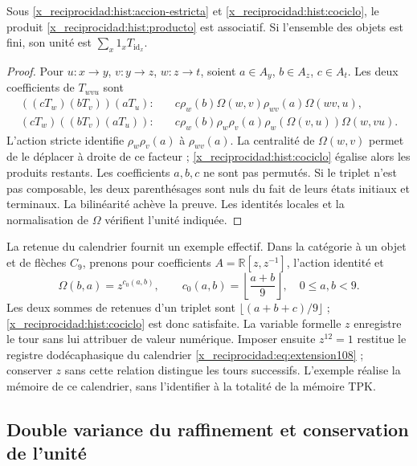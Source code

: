 \begin{proposition}
Sous \eqref{x_reciprocidad:hist:accion-estricta} et \eqref{x_reciprocidad:hist:cociclo}, le produit
\eqref{x_reciprocidad:hist:producto} est associatif. Si l’ensemble des objets est fini,
son unité est \(\sum_x1_xT_{\operatorname{id}_x}\).
\end{proposition}
\begin{proof}
Pour \(u:x\to y\), \(v:y\to z\), \(w:z\to t\), soient
\(a\in A_y\), \(b\in A_z\), \(c\in A_t\). Les deux coefficients
de \(T_{wvu}\) sont
\begin{align*}
 ((cT_w)(bT_v))(aT_u):\quad&
 c\rho_w(b)\Omega(w,v)\rho_{wv}(a)\Omega(wv,u),\\
 (cT_w)((bT_v)(aT_u)):\quad&
 c\rho_w(b)\rho_w\rho_v(a)\rho_w(\Omega(v,u))\Omega(w,vu).
\end{align*}
L’action stricte identifie \(\rho_w\rho_v(a)\) à \(\rho_{wv}(a)\).
La centralité de \(\Omega(w,v)\) permet de le déplacer à droite de
ce facteur ; \eqref{x_reciprocidad:hist:cociclo} égalise alors les produits restants.
Les coefficients \(a,b,c\) ne sont pas permutés. Si le triplet n’est pas composable,
les deux parenthésages sont nuls du fait de leurs états initiaux et terminaux.
La bilinéarité achève la preuve. Les identités locales et la
normalisation de \(\Omega\) vérifient l’unité indiquée.
\end{proof}

La retenue du calendrier fournit un exemple effectif. Dans la catégorie
à un objet et de flèches \(C_9\), prenons pour coefficients
\(A=\mathbb R[z,z^{-1}]\), l’action identité et
\[
 \Omega(b,a)=z^{c_0(a,b)},\qquad
 c_0(a,b)=\left\lfloor\frac{a+b}{9}\right\rfloor,
 \quad 0\leq a,b<9.
\]
Les deux sommes de retenues d’un triplet sont
\(\lfloor(a+b+c)/9\rfloor\) ; \eqref{x_reciprocidad:hist:cociclo}
est donc satisfaite. La variable formelle \(z\) enregistre le tour sans
lui attribuer de valeur numérique. Imposer ensuite \(z^{12}=1\) restitue le
registre dodécaphasique du calendrier \eqref{x_reciprocidad:eq:extension108} ; conserver
\(z\) sans cette relation distingue les tours successifs. L’exemple réalise
la mémoire de ce calendrier, sans l’identifier à la totalité de la
mémoire TPK.

\subsection{Double variance du raffinement et conservation de l’unité}
\label{x_reciprocidad:hist:doble-varianza}

